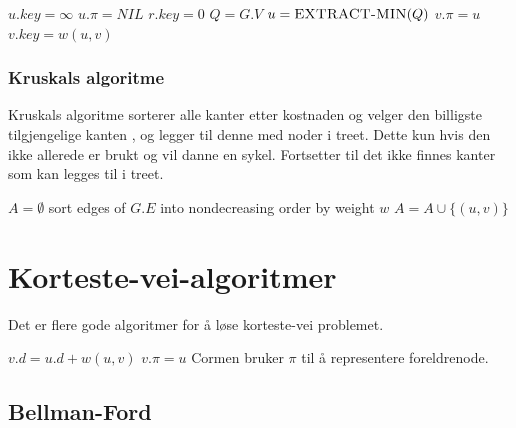 \documentclass[a4paper, norsk,  10pt]{article}
\begin{document}
{{\begin{algorithmic}
\begin{algoritmic}
	\State $u.key = \infty$
	\State $u.\pi = NIL$
\EndFor
\State $r.key = 0$
\State $Q = G.V$
	\State $u = \Call{EXTRACT-MIN}{Q}$
			\State $v.\pi = u$
			\State $v.key = w(u, v)$
		\EndIf
	\EndFor
\EndWhile
\EndFunction
\end{algoritmic}

\subsubsection{Kruskals algoritme}

Kruskals algoritme sorterer alle kanter etter kostnaden og velger den billigste tilgjengelige kanten , og legger til denne med noder i treet. Dette kun hvis den ikke allerede er brukt og vil danne en sykel. Fortsetter til det ikke finnes kanter som kan legges til i treet.  \\ \hfill

\begin{algoritmic}
\State $A = \emptyset$
	\State {}
\EndFor
\State sort edges of $G.E$ into nondecreasing order by weight $w$
		\State $A = A \cup \{ (u,v) \}$
		\State {} 
	\EndIf  
\EndFor
\State {}


\EndFunction
\end{algoritmic}

\section{Korteste-vei-algoritmer}

Det er flere gode algoritmer for å løse korteste-vei problemet. \\

\begin{algoritmic}
		\State $v.d = u.d + w(u, v)$
		\State $v.\pi = u$ 
		\State Cormen bruker $\pi$ til å representere foreldrenode.
	\EndIf
\end{algoritmic}

\subsection{Bellman-Ford} 


\end{algorithmic}}}
\end{document}

